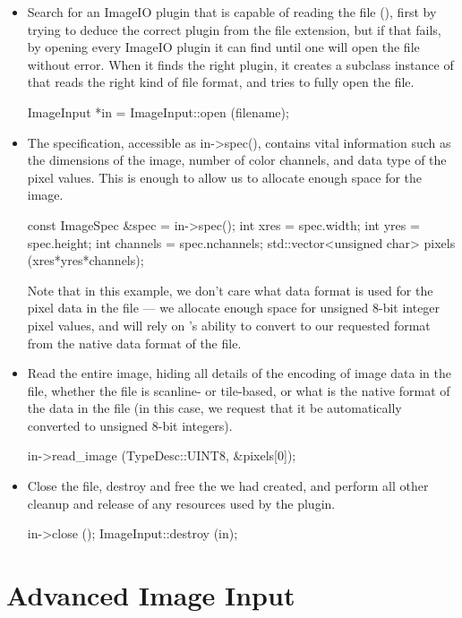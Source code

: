 \begin{itemize}
\item Search for an ImageIO plugin that is capable of reading the file
  (), first by trying to deduce the correct plugin from the
  file extension, but if that fails, by opening every ImageIO plugin it
  can find until one will open the file without error.  When it finds
  the right plugin, it creates a subclass instance of \ImageInput that
  reads the right kind of file format, and tries to fully open the file.
  \begin{code}
        ImageInput *in = ImageInput::open (filename);
  \end{code}
\item The specification, accessible as {\cf in->spec()}, contains 
  vital information such as the
  dimensions of the image, number of color channels, and data type of
  the pixel values.  This is enough to allow us to allocate enough space
  for the image.
  \begin{code}
        const ImageSpec &spec = in->spec();
        int xres = spec.width;
        int yres = spec.height;
        int channels = spec.nchannels;
        std::vector<unsigned char> pixels (xres*yres*channels);
  \end{code}
  Note that in this example, we don't care what data format is used for
  the pixel data in the file --- we allocate enough space for unsigned
  8-bit integer pixel values, and will rely on \product's ability to
  convert to our requested format from the native data format of the
  file.
\item Read the entire image, hiding all details of the encoding of image
  data in the file, whether the file is scanline- or tile-based, or what
  is the native format of the data in the file (in this case, we request
  that it be automatically converted to unsigned 8-bit integers).
  \begin{code}
        in->read_image (TypeDesc::UINT8, &pixels[0]);
  \end{code}
\item Close the file, destroy and free the \ImageInput we had created,
  and perform all other cleanup and release of any resources used by
  the plugin.
  \begin{code}
        in->close ();
        ImageInput::destroy (in);
  \end{code}
\end{itemize}



\section{Advanced Image Input}
\label{sec:advancedimageinput}

